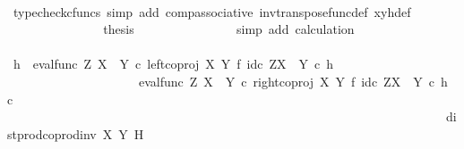 \begin{isabellebody}
\ \ \ \ \ \ \ \ \ \ \ \ \ \ \isamarkupfalse%
\ {\isacharparenleft}{\kern0pt}typecheck{\isacharunderscore}{\kern0pt}cfuncs{\isacharcomma}{\kern0pt}\ simp\ add{\isacharcolon}{\kern0pt}\ comp{\isacharunderscore}{\kern0pt}associative{}\ inv{\isacharunderscore}{\kern0pt}transpose{\isacharunderscore}{\kern0pt}func{\isacharunderscore}{\kern0pt}def{}\ xyh{\isacharunderscore}{\kern0pt}def{\isacharparenright}{\kern0pt}\isanewline
\ \ \ \ \ \ \ \ \ \ \ \ \isamarkupfalse%
\ \isamarkupfalse%
\ {\isacharquery}{\kern0pt}thesis\isanewline
\ \ \ \ \ \ \ \ \ \ \ \ \ \ \isamarkupfalse%
\ {\isacharparenleft}{\kern0pt}simp\ add{\isacharcolon}{\kern0pt}\ calculation{\isacharparenright}{\kern0pt}\isanewline
\ \ \ \ \ \ \ \ \ \ \isamarkupfalse%
\isanewline
\ \ \ \ \ \ \ \ \isamarkupfalse%
\isanewline
\ \ \ \ \ \ \isamarkupfalse%
\isanewline
\ \ \ \ \ \ \isamarkupfalse%
\ \isamarkupfalse%
\ {\isachardoublequoteopen}h\ {\isacharequal}{\kern0pt}\ {\isacharparenleft}{\kern0pt}{\isacharparenleft}{\kern0pt}{\isacharparenleft}{\kern0pt}eval{\isacharunderscore}{\kern0pt}func\ Z\ {\isacharparenleft}{\kern0pt}X\ {\isasymCoprod}\ Y{\isacharparenright}{\kern0pt}\ {\isasymcirc}\isactrlsub c\ left{\isacharunderscore}{\kern0pt}coproj\ X\ Y\ {\isasymtimes}\isactrlsub f\ id\isactrlsub c\ {\isacharparenleft}{\kern0pt}Z\isactrlbsup {\isacharparenleft}{\kern0pt}X\ {\isasymCoprod}\ Y{\isacharparenright}{\kern0pt}\isactrlesup {\isacharparenright}{\kern0pt}{\isacharparenright}{\kern0pt}\isactrlsup {\isasymsharp}\ {\isasymcirc}\isactrlsub c\ h{\isacharparenright}{\kern0pt}\isactrlsup {\isasymflat}\ {\isasymamalg}\isanewline
\ \ \ \ \ \ \ \ \ \ \ \ \ \ \ \ \ \ \ \ \ {\isacharparenleft}{\kern0pt}{\isacharparenleft}{\kern0pt}eval{\isacharunderscore}{\kern0pt}func\ Z\ {\isacharparenleft}{\kern0pt}X\ {\isasymCoprod}\ Y{\isacharparenright}{\kern0pt}\ {\isasymcirc}\isactrlsub c\ right{\isacharunderscore}{\kern0pt}coproj\ X\ Y\ {\isasymtimes}\isactrlsub f\ id\isactrlsub c\ {\isacharparenleft}{\kern0pt}Z\isactrlbsup {\isacharparenleft}{\kern0pt}X\ {\isasymCoprod}\ Y{\isacharparenright}{\kern0pt}\isactrlesup {\isacharparenright}{\kern0pt}{\isacharparenright}{\kern0pt}\isactrlsup {\isasymsharp}\ {\isasymcirc}\isactrlsub c\ h{\isacharparenright}{\kern0pt}\isactrlsup {\isasymflat}\ {\isasymcirc}\isactrlsub c\isanewline
\ \ \ \ \ \ \ \ \ \ \ \ \ \ \ \ \ \ \ \ \ \ \ \ \ \ \ \ \ \ \ \ \ \ \ \ \ \ \ \ \ \ \ \ \ \ \ \ \ \ \ \ \ \ \ \ \ \ \ \ \ \ \ \ \ \ \ \ \ \ dist{\isacharunderscore}{\kern0pt}prod{\isacharunderscore}{\kern0pt}coprod{\isacharunderscore}{\kern0pt}inv{}\ X\ Y\ H{\isacharparenright}{\kern0pt}\isactrlsup {\isasymsharp}{\isachardoublequoteclose}\isanewline

\end{isabellebody}
